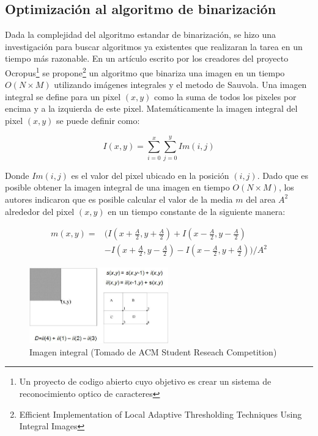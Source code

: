 \documentclass[a4paper, 11pt, oneside]{report}
\begin{document}
\subsection{Optimización al algoritmo de binarización}

Dada la complejidad del algoritmo estandar de binarización, se hizo una investigación para buscar algoritmos ya existentes que realizaran la tarea en un tiempo más razonable. En un artículo escrito por los creadores del proyecto Ocropus\footnote{Un proyecto de codigo abierto cuyo objetivo es crear un sistema de reconocimiento optico de caracteres} se propone\footnote{Efficient Implementation of Local Adaptive Thresholding Techniques Using Integral Images} un algoritmo que binariza una imagen en un tiempo $O(N \times M)$ utilizando imágenes integrales y el metodo de Sauvola. Una imagen integral se define para un pixel $(x, y)$ como la suma de todos los pixeles por encima y a la izquierda de este pixel. Matemáticamente la imagen integral del pixel $(x, y)$ se puede definir como:

\begin{equation}
	I(x, y) = \sum_{i=0}^{x}\sum_{j=0}^{y}Im(i, j)
\end{equation}

Donde $Im(i, j)$ es el valor del pixel ubicado en la posición $(i, j)$. Dado que es posible obtener la imagen integral de una imagen en tiempo $O(N \times M)$, los autores indicaron que es posible calcular el valor de la media $m$ del area $A^{2}$ alrededor del pixel $(x, y)$ en un tiempo constante de la siguiente manera:

\begin{align*}
  m(x, y) =& (I(x + \frac{A}{2}, y + \frac{A}{2}) + I(x - \frac{A}{2}, y - \frac{A}{2}) \\
	   &- I(x + \frac{A}{2}, y - \frac{A}{2}) - I(x - \frac{A}{2}, y + \frac{A}{2})) / A^{2}
\end{align*}

\begin{figure}[htb]
\begin{center}
\leavevmode
\includegraphics[width=6cm]{img/integral.png}
\end{center}
\caption{Imagen integral (Tomado de ACM Student Reseach Competition)}
\label{fig:integral}
\end{figure}
\end{document}
